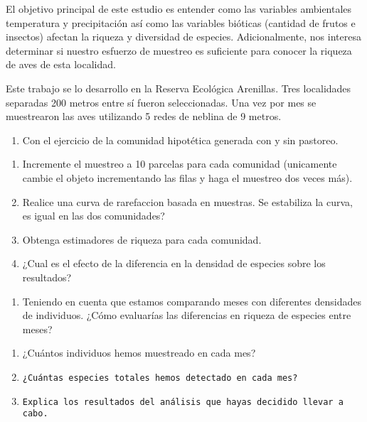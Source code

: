 \documentclass[]{book}
\providecommand{\tightlist}{%
  \setlength{\itemsep}{0pt}\setlength{\parskip}{0pt}}
\begin{document}
El objetivo principal de este estudio es entender como las variables
ambientales temperatura y precipitación así como las variables bióticas
(cantidad de frutos e insectos) afectan la riqueza y diversidad de
especies. Adicionalmente, nos interesa determinar si nuestro esfuerzo de
muestreo es suficiente para conocer la riqueza de aves de esta
localidad.

Este trabajo se lo desarrollo en la Reserva Ecológica Arenillas. Tres
localidades separadas 200 metros entre sí fueron seleccionadas. Una vez
por mes se muestrearon las aves utilizando 5 redes de neblina de 9
metros.

\begin{enumerate}
\def\labelenumi{\arabic{enumi}.}
\tightlist
\item
  Con el ejercicio de la comunidad hipotética generada con y sin
  pastoreo.
\end{enumerate}

\begin{enumerate}
\def\labelenumi{\alph{enumi}.}
\tightlist
\item
  Incremente el muestreo a 10 parcelas para cada comunidad (unicamente
  cambie el objeto incrementando las filas y haga el muestreo dos veces
  más).
\item
  Realice una curva de rarefaccion basada en muestras. Se estabiliza la
  curva, es igual en las dos comunidades?
\item
  Obtenga estimadores de riqueza para cada comunidad.
\item
  ¿Cual es el efecto de la diferencia en la densidad de especies sobre
  los resultados?
\end{enumerate}

\begin{enumerate}
\def\labelenumi{\arabic{enumi}.}
\setcounter{enumi}{1}
\tightlist
\item
  Teniendo en cuenta que estamos comparando meses con diferentes
  densidades de individuos. ¿Cómo evaluarías las diferencias en riqueza
  de especies entre meses?
\end{enumerate}

\begin{enumerate}
\def\labelenumi{\alph{enumi}.}
\item
  ¿Cuántos individuos hemos muestreado en cada mes?
\item
\begin{verbatim}
¿Cuántas especies totales hemos detectado en cada mes?
\end{verbatim}
\item
\begin{verbatim}
Explica los resultados del análisis que hayas decidido llevar a cabo.
\end{verbatim}
\end{enumerate}
\end{document}
